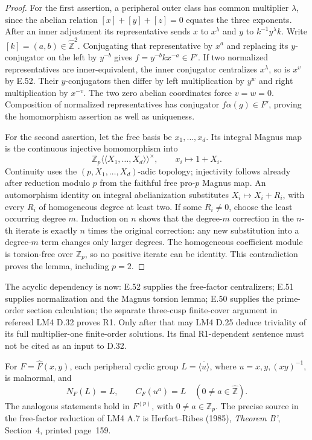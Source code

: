 \begin{proof}
For the first assertion, a peripheral outer class
has common multiplier \(\lambda\), since the
abelian relation \([x]+[y]+[z]=0\) equates the
three exponents. After an inner adjustment its
representative sends \(x\) to \(x^\lambda\) and
\(y\) to \(k^{-1}y^\lambda k\). Write
\([k]=(a,b)\in\widehat{\mathbb Z}^2\).
Conjugating that representative by \(x^a\) and
replacing its \(y\)-conjugator on the left by
\(y^{-b}\) gives
\(f=y^{-b}kx^{-a}\in F'\).
If two normalized representatives are inner-equivalent,
the inner conjugator centralizes \(x^\lambda\),
so is \(x^v\) by E.52. Their \(y\)-conjugators
then differ by left multiplication by \(y^w\)
and right multiplication by \(x^{-v}\).
The two zero abelian coordinates force \(v=w=0\).
Composition of normalized representatives has
conjugator \(f\alpha(g)\in F'\), proving the
homomorphism assertion as well as uniqueness.

For the second assertion, let the free basis be
\(x_1,\ldots,x_d\). Its integral Magnus map is
the continuous injective homomorphism into
\[
 \mathbb Z_p\langle\!\langle X_1,\ldots,X_d
               \rangle\!\rangle^{\times},
 \qquad x_i\longmapsto1+X_i.
\]
Continuity uses the \((p,X_1,\ldots,X_d)\)-adic
topology; injectivity follows already after reduction
modulo \(p\) from the faithful free pro-\(p\)
Magnus map. An automorphism identity on integral
abelianization substitutes
\(X_i\mapsto X_i+R_i\), with every \(R_i\)
of homogeneous degree at least two.
If some \(R_i\ne0\), choose the least occurring
degree \(m\). Induction on \(n\) shows that the
degree-\(m\) correction in the \(n\)-th iterate
is exactly \(n\) times the original correction:
any new substitution into a degree-\(m\) term
changes only larger degrees. The homogeneous
coefficient module is torsion-free over
\(\mathbb Z_p\), so no positive iterate can be
identity. This contradiction proves the lemma,
including \(p=2\).
\end{proof}

The acyclic dependency is now: E.52 supplies the
free-factor centralizers; E.51 supplies normalization
and the Magnus torsion lemma; E.50 supplies the
prime-order section calculation; the separate
three-cusp finite-cover argument in refereed
LM4 D.32 proves R1. Only after that may LM4 D.25
deduce triviality of its full multiplier-one
finite-order solutions. Its final R1-dependent
sentence must not be cited as an input to D.32.

For \(F=\widehat F(x,y)\), each peripheral cyclic
group \(L=\overline{\langle u\rangle}\), where
\(u=x,y,(xy)^{-1}\), is malnormal, and
\[
 N_F(L)=L,
 \qquad C_F(u^a)=L
       \quad(0\ne a\in\widehat{\mathbb Z}).
\]
The analogous statements hold in \(F^{(p)}\),
with \(0\ne a\in\mathbb Z_p\). The precise
source in the free-factor reduction of LM4 A.7
is Herfort--Ribes (1985), \emph{Theorem B'},
Section~4, printed page~159. \cite{A_HR1985}

